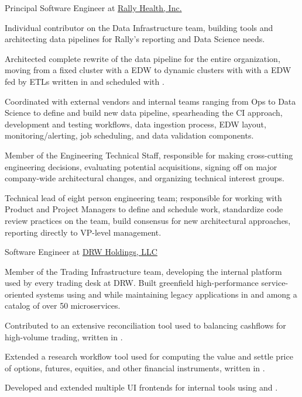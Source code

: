 \documentclass[10pt]{article}
\begin{document}
%
{Principal Software Engineer}%
{at}%
{\href{https://www.rallyhealth.com}{Rally Health, Inc.}}%
{Individual contributor on the Data Infrastructure team, building
  tools and architecting data pipelines for Rally's reporting and Data
  Science needs.

  \begin{exlist}
  \item Architected complete rewrite of the data pipeline for the
    entire organization, moving from a fixed 
    cluster with a \hive EDW to dynamic clusters with
     with a  EDW fed by \spark
    ETLs written in \scala and scheduled with .

  \item Coordinated with external vendors and internal teams ranging
    from Ops to Data Science to define and build new data pipeline,
    spearheading the CI approach, development and testing workflows,
    data ingestion process, EDW layout, monitoring/alerting, job
    scheduling, and data validation components.

  \item Member of the Engineering Technical Staff, responsible for
    making cross-cutting engineering decisions, evaluating potential
    acquisitions, signing off on major company-wide architectural
    changes, and organizing technical interest groups.

  \item Technical lead of eight person engineering team; responsible
    for working with Product and Project Managers to define and
    schedule work, standardize code review practices on the team,
    build consensus for new architectural approaches, reporting
    directly to VP-level management.
  \end{exlist}
}

%
{Software Engineer}%
{at}%
{\href{http://www.drw.com}{DRW Holdings, LLC}}%
{Member of the Trading Infrastructure team, developing the internal
  platform used by every trading desk at DRW. Built greenfield
  high-performance service-oriented systems using \clojure and \java
  while maintaining legacy applications in \ruby and \csh among a
  catalog of over 50 microservices.

  \begin{exlist}
    \item Contributed to an extensive reconciliation tool used to
      balancing cashflows for high-volume trading, written in \ruby.

    \item Extended a research workflow tool used for computing the
      value and settle price of options, futures, equities, and
      other financial instruments, written in \clojure.

    \item Developed and extended multiple UI frontends for internal
      tools using  and
      .
  \end{exlist}
}
\end{document}
